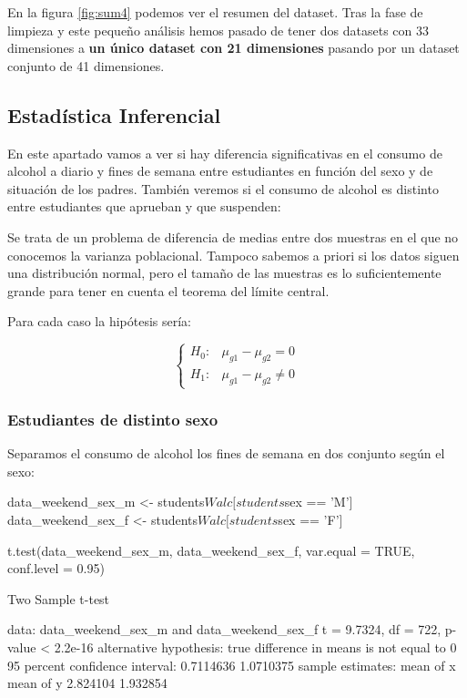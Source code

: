 \documentclass[12pt,a4paper]{article}
\begin{document}
En la figura \ref{fig:sum4} podemos ver el resumen del dataset. Tras la fase de limpieza y este pequeño análisis hemos pasado de tener dos datasets con 33 dimensiones a \textbf{un único dataset con 21 dimensiones} pasando por un dataset conjunto de 41 dimensiones.  


\clearpage

\subsection{ Estadística Inferencial}
En este apartado vamos a ver si hay diferencia significativas en el consumo de alcohol a diario y fines de semana entre estudiantes en función del sexo y de situación de los padres. También veremos si el consumo de alcohol es distinto entre estudiantes que aprueban y que suspenden:
  
Se trata de un problema de diferencia de medias entre dos muestras en el que no conocemos la varianza poblacional. Tampoco sabemos a priori si los datos siguen una distribución normal, pero el tamaño de las muestras es lo suficientemente grande para tener en cuenta el teorema del límite central.


Para cada caso la hipótesis sería: 

$$
\left\{
\begin{array}{ll}
H_{0}: &  \mu_{g1}-\mu_{g2}=0\\
H_{1}: & \mu_{g1}-\mu_{g2}\ne0
\end{array}
\right.
$$


\subsubsection{Estudiantes de distinto sexo}

Separamos el consumo de alcohol los fines de semana en dos conjunto según el sexo:

\begin{spverbatim}
data_weekend_sex_m <- students$Walc[students$sex == 'M'] 
data_weekend_sex_f <- students$Walc[students$sex == 'F'] 

t.test(data_weekend_sex_m, data_weekend_sex_f, var.equal = TRUE, conf.level = 0.95)

Two Sample t-test

data:  data_weekend_sex_m and data_weekend_sex_f
t = 9.7324, df = 722, p-value < 2.2e-16
alternative hypothesis: true difference in means is not equal to 0
95 percent confidence interval:
 0.7114636 1.0710375
sample estimates:
mean of x mean of y 
 2.824104  1.932854
\end{spverbatim}
\end{document}
